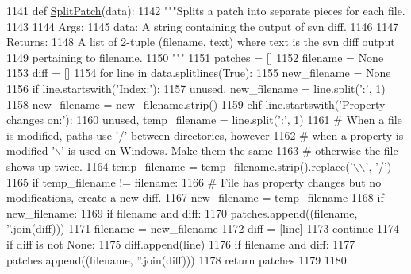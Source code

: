 \begin{DoxyCode}
1141 \textcolor{keyword}{def }\hyperlink{namespaceupload_a9dd260785ca4cc97e245234811ef1949}{SplitPatch}(data):
1142   \textcolor{stringliteral}{"""Splits a patch into separate pieces for each file.}
1143 \textcolor{stringliteral}{}
1144 \textcolor{stringliteral}{  Args:}
1145 \textcolor{stringliteral}{    data: A string containing the output of svn diff.}
1146 \textcolor{stringliteral}{}
1147 \textcolor{stringliteral}{  Returns:}
1148 \textcolor{stringliteral}{    A list of 2-tuple (filename, text) where text is the svn diff output}
1149 \textcolor{stringliteral}{      pertaining to filename.}
1150 \textcolor{stringliteral}{  """}
1151   patches = []
1152   filename = \textcolor{keywordtype}{None}
1153   diff = []
1154   \textcolor{keywordflow}{for} line \textcolor{keywordflow}{in} data.splitlines(\textcolor{keyword}{True}):
1155     new\_filename = \textcolor{keywordtype}{None}
1156     \textcolor{keywordflow}{if} line.startswith(\textcolor{stringliteral}{'Index:'}):
1157       unused, new\_filename = line.split(\textcolor{stringliteral}{':'}, 1)
1158       new\_filename = new\_filename.strip()
1159     \textcolor{keywordflow}{elif} line.startswith(\textcolor{stringliteral}{'Property changes on:'}):
1160       unused, temp\_filename = line.split(\textcolor{stringliteral}{':'}, 1)
1161       \textcolor{comment}{# When a file is modified, paths use '/' between directories, however}
1162       \textcolor{comment}{# when a property is modified '\(\backslash\)' is used on Windows.  Make them the same}
1163       \textcolor{comment}{# otherwise the file shows up twice.}
1164       temp\_filename = temp\_filename.strip().replace(\textcolor{stringliteral}{'\(\backslash\)\(\backslash\)'}, \textcolor{stringliteral}{'/'})
1165       \textcolor{keywordflow}{if} temp\_filename != filename:
1166         \textcolor{comment}{# File has property changes but no modifications, create a new diff.}
1167         new\_filename = temp\_filename
1168     \textcolor{keywordflow}{if} new\_filename:
1169       \textcolor{keywordflow}{if} filename \textcolor{keywordflow}{and} diff:
1170         patches.append((filename, \textcolor{stringliteral}{''}.join(diff)))
1171       filename = new\_filename
1172       diff = [line]
1173       \textcolor{keywordflow}{continue}
1174     \textcolor{keywordflow}{if} diff \textcolor{keywordflow}{is} \textcolor{keywordflow}{not} \textcolor{keywordtype}{None}:
1175       diff.append(line)
1176   \textcolor{keywordflow}{if} filename \textcolor{keywordflow}{and} diff:
1177     patches.append((filename, \textcolor{stringliteral}{''}.join(diff)))
1178   \textcolor{keywordflow}{return} patches
1179 
1180 
\end{DoxyCode}
